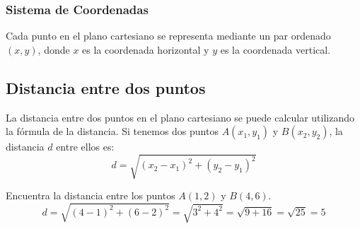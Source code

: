 \subsubsection{Sistema de Coordenadas}
Cada punto en el plano cartesiano se representa mediante un par ordenado \((x, y)\), donde \( x \) es la coordenada horizontal y \( y \) es la coordenada vertical.
\begin{center}
\end{center}



\subsection{Distancia entre dos puntos}

La distancia entre dos puntos en el plano cartesiano se puede calcular utilizando la fórmula de la distancia. Si tenemos dos puntos \( A(x_1, y_1) \) y \( B(x_2, y_2) \), la distancia \( d \) entre ellos es:
\begin{equation}
    d = \sqrt{(x_2 - x_1)^2 + (y_2 - y_1)^2}
\end{equation}

\begin{example}
    Encuentra la distancia entre los puntos \( A(1, 2) \) y \( B(4, 6) \).
\[
d = \sqrt{(4 - 1)^2 + (6 - 2)^2} = \sqrt{3^2 + 4^2} = \sqrt{9 + 16} = \sqrt{25} = 5
\]
\end{example}

